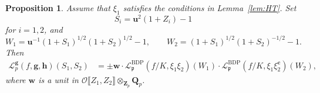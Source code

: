 \documentclass[10pt,letterpaper]{amsart}
\theoremstyle{plain}
\theoremstyle{definition}
\theoremstyle{definition}
\theoremstyle{plain}
\newtheorem{prop}[thm]{Proposition}
\theoremstyle{plain}
\theoremstyle{plain}
\theoremstyle{remark}
\numberwithin{equation}{section}
\newcommand{\cc}{\mathbf{c}}
\newcommand{\ch}{\xi}
\newcommand{\pp}{\mathfrak{p}}
\DeclareMathOperator{\BDP}{BDP} %
\newcommand{\bQ}{\mathbf{Q}}
\def\cO{\mathcal O}
\newcommand{\Z}{\mathbf{Z}}
\newcommand{\dBr}[1]{\llbracket{#1}\rrbracket}
\newcommand{\bff}{{\boldsymbol{f}}}
\newcommand{\bfg}{{\boldsymbol{g}}}
\newcommand{\bfh}{{\boldsymbol{h}}}
\begin{document}
\begin{prop}\label{prop:factor-L-indef}
Assume that $\ch_1$ satisfies the conditions in Lemma~\ref{lem:HT}.  Set 
\[
S_i=\mathbf{u}^2(1+Z_i)-1
\]
for $i=1,2$, and 
\[
W_1=\mathbf{u}^{-1}(1+S_1)^{1/2}(1+S_2)^{1/2}-1,\quad\quad
W_2=(1+S_1)^{1/2}(1+S_2)^{-1/2}-1.
\]
Then
\begin{align*}
\mathscr{L}_p^{\bfg}(f,\bfg,\bfh)(S_1,S_2)
&=\pm\mathbf{w}\cdot\mathscr{L}_\pp^{\BDP}(f/K,\ch_1\ch_2)(W_1)\cdot\mathscr{L}_\pp^{\BDP}(f/K,\ch_1\ch_2^\cc)(W_2),
\end{align*}
where $\mathbf{w}$ is a unit in $\cO\dBr{Z_1,Z_2}\otimes_{\Z_p}\bQ_p$.
\end{prop}
\end{document}
